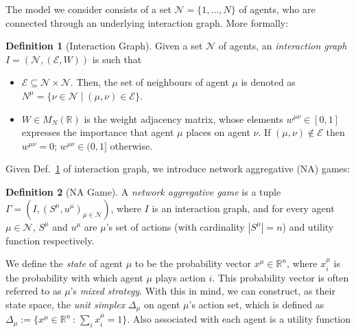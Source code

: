 \documentclass{article}
\theoremstyle{definition}
\newtheorem{definition}{Definition}
\newcommand{\agentset}{\mathcal{N}}
\newcommand{\edgeset}{\mathcal{E}}
\newcommand{\weightset}{W}
\newcommand{\actionset}[1]{S^{#1}}
\newcommand{\utility}[1]{u^{#1}}
\newcommand{\wmunu}{w^{\mu \nu}}
\newcommand{\xmu}{x^{\mu}}
\newcommand{\xmuaction}[1]{x^{\mu}_{#1}}
\begin{document}
The model we consider consists of
a set $\agentset = \{1,
\ldots , N \}$ of agents, who are connected through an underlying
interaction graph.
More formally:
%        
\begin{definition}[Interaction Graph] \label{interactiongraph}
	Given a set $\agentset$ of agents, an {\em interaction graph} $I = (\agentset, (\edgeset,
	\weightset))$ is such that
	\begin{itemize}
		
		\item $\edgeset \subseteq \agentset \times \agentset$.  Then, the set of
		neighbours of agent $\mu$ is denoted as $N^\mu = \{\nu \in
		\agentset \mid (\mu, \nu) \in \edgeset\}$.
		
		\item $\weightset \in M_N(\mathbb{R})$ is the weight adjacency matrix, whose elements $w^{\mu
			\nu} \in [0, 1]$ expresses the importance that agent $\mu$ places on agent $\nu$. If $(\mu, \nu) \not
		\in \edgeset$ then $w^{\mu \nu} = 0$;        $\wmunu \in (0, 1]$ otherwise.
	\end{itemize}
\end{definition}

Given Def.~\ref{interactiongraph} of interaction graph,
we introduce network aggregative (NA) games:
%
\begin{definition}[NA Game]
	A {\em network aggregative game} is
	a tuple $\Gamma = (I, (\actionset{\mu},
	\utility{\mu})_{\mu \in \mathcal{N}})$, where $I$ is an
	interaction graph, and for every agent $\mu \in \mathcal{N}$, $\actionset{\mu}$ and $\utility{\mu}$
	are $\mu$'s set of actions (with cardinality $|\actionset{\mu}| = n$)
	and utility function respectively.
\end{definition}

We define the \emph{state} of agent $\mu$ to be the probability
vector $\xmu \in \mathbb{R}^n$, where $\xmu_i$ is the probability
with which agent $\mu$ plays action $i$.
This
probability vector is often referred to as $\mu$'s \emph{mixed
	strategy}. With this in mind, we can construct, as their state
space, the {\em unit simplex} $\Delta_\mu$ on agent $\mu$'s action set, which
is defined
as $\Delta_\mu := \{\xmu \in \mathbb{R}^n \, : \, \sum_i
\xmuaction{i} = 1\}$. Also associated with each agent is a utility
function
\end{document}

